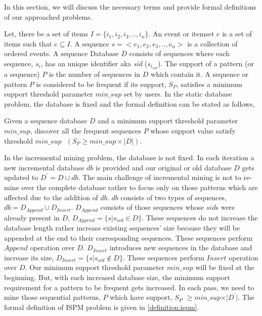 In this section, we will discuss the necessary terms and provide formal definitions of our approached problems.

Let, there be a set of items $I=\{i_{1},i_{2},i_{3},..,i_{n}\}$. An event or itemset $e$ is a set of items such that $e \subseteq I$. A sequence $s=< e_{1},e_{2},e_{3},..,e_{n}>$ is a collection of ordered events. A sequence Database $D$ consists of sequences where each sequence, $s_{i}$, has an unique identifier aka \textit{sid} ($s_{i_{sid}}$). The support of a pattern (or a sequence) $P$ is the number of sequences in $D$ which contain it. A sequence or pattern $P$ is considered to be frequent if its support, $S_{P}$, satisfies a minimum support threshold parameter $min\_sup$ set by users. In the static database problem, the database is fixed and the formal definition can be stated as follows,

\begin{definition}
    Given a sequence database $D$ and a minimum support threshold parameter $min\_sup$, discover all the frequent sequences $P$ whose support value satisfy  threshold $min\_sup\text{ }(S_{P} \geq min\_sup \times |D|)$.
\end{definition}

In the incremental mining problem, the database is not fixed. In each iteration a new incremental database $db$ is provided and our original or old database $D$ gets updated to $D^{\prime}=D \cup db$. The main challenge of incremental mining is not to re-mine over the complete database rather to focus only on those patterns which are affected due to the addition of $db$. $db$ consists of two types of sequences, $db = D_{Append} \cup D_{Insert}$. $D_{Append}$ consists of those sequences whose $sid$s were already present in $D$, $D_{Append}=\{s \vert s_{sid} \in D\}$. These sequences do not increase the database length rather increase existing sequences' size because they will be appended at the end to their corresponding sequences. These sequences perform $Append$ operation over $D$. $D_{Insert}$ introduces new sequences in the database and increase its size, $D_{Insert}=\{s\vert s_{sid} \notin D \}$. These sequences perform $Insert$ operation over $D$. Our minimum support threshold parameter $min\_sup$ will be fixed at the beginning. But, with each increased database size, the minimum support requirement for a pattern to be frequent gets increased. In each pass, we need to mine those sequential patterns, $P$ which have support, $S_{P}$ $\geq min\_sup \times \vert D^{\prime} \vert$. The formal definition of ISPM problem is given in \ref{definition:ispm}.

